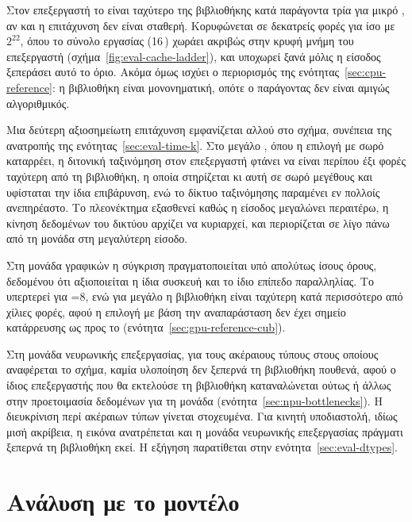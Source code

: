 Στον επεξεργαστή το  είναι ταχύτερο της βιβλιοθήκης κατά
παράγοντα τρία για μικρό , αν και η επιτάχυνση δεν είναι σταθερή.
Κορυφώνεται σε δεκατρείς φορές για  ίσο με $2^{22}$, όπου το σύνολο
εργασίας (16\,) χωράει ακριβώς στην  κρυφή μνήμη του επεξεργαστή
(σχήμα~\ref{fig:eval-cache-ladder}), και υποχωρεί ξανά μόλις η είσοδος
ξεπεράσει αυτό το όριο. Ακόμα όμως ισχύει ο περιορισμός της
ενότητας~\ref{sec:cpu-reference}: η βιβλιοθήκη είναι μονονηματική, οπότε ο
παράγοντας δεν είναι αμιγώς αλγοριθμικός.

Μια δεύτερη αξιοσημείωτη επιτάχυνση εμφανίζεται αλλού στο σχήμα, συνέπεια της
ανατροπής της ενότητας~\ref{sec:eval-time-k}. Στο μεγάλο , όπου η επιλογή
με σωρό καταρρέει, η διτονική ταξινόμηση στον επεξεργαστή φτάνει να είναι
περίπου έξι φορές ταχύτερη από τη βιβλιοθήκη, η οποία στηρίζεται κι αυτή σε
σωρό μεγέθους  και υφίσταται την ίδια επιβάρυνση, ενώ το δίκτυο
ταξινόμησης παραμένει εν πολλοίς ανεπηρέαστο. Το πλεονέκτημα εξασθενεί καθώς η
είσοδος μεγαλώνει περαιτέρω, η κίνηση δεδομένων του δικτύου αρχίζει να
κυριαρχεί, και περιορίζεται σε λίγο πάνω από τη μονάδα στη μεγαλύτερη είσοδο.

Στη μονάδα γραφικών η σύγκριση πραγματοποιείται υπό απολύτως ίσους όρους,
δεδομένου ότι αξιοποιείται η ίδια συσκευή και το ίδιο επίπεδο παραλληλίας. Το
 υπερτερεί για =8, ενώ για μεγάλο  η βιβλιοθήκη
είναι ταχύτερη κατά περισσότερο από χίλιες φορές, αφού η επιλογή με βάση την
αναπαράσταση δεν έχει σημείο κατάρρευσης ως προς το 
(ενότητα~\ref{sec:gpu-reference-cub}).

Στη μονάδα νευρωνικής επεξεργασίας, για τους ακέραιους τύπους στους οποίους
αναφέρεται το σχήμα, καμία υλοποίηση δεν ξεπερνά τη βιβλιοθήκη πουθενά, αφού ο
ίδιος επεξεργαστής που θα εκτελούσε τη βιβλιοθήκη καταναλώνεται ούτως ή άλλως
στην προετοιμασία δεδομένων για τη μονάδα (ενότητα~\ref{sec:npu-bottlenecks}).
Η διευκρίνιση περί ακέραιων τύπων γίνεται στοχευμένα. Για κινητή υποδιαστολή,
ιδίως μισή ακρίβεια, η εικόνα ανατρέπεται και η μονάδα νευρωνικής επεξεργασίας
πράγματι ξεπερνά τη βιβλιοθήκη εκεί. Η εξήγηση παρατίθεται στην
ενότητα~\ref{sec:eval-dtypes}.

\section{Ανάλυση με το μοντέλο }
\label{sec:eval-roofline}

